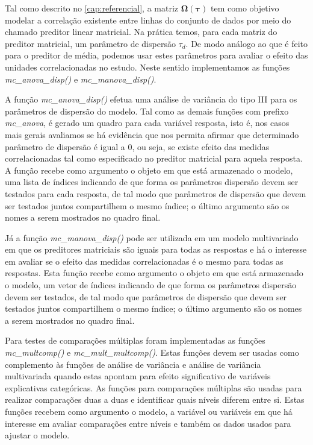 Tal como descrito no \autoref{cap:referencial}, a matriz $\boldsymbol{\Omega({\tau})}$ tem como objetivo modelar a correlação existente entre linhas do conjunto de dados por meio do chamado preditor linear matricial. Na prática temos, para cada matriz do preditor matricial, um parâmetro de dispersão $\tau_d$. De modo análogo ao que é feito para o preditor de média, podemos usar estes parâmetros para avaliar o efeito das unidades correlacionadas no estudo. Neste sentido implementamos as funções \emph{mc\_anova\_disp()} e \emph{mc\_manova\_disp()}. 

A função \emph{mc\_anova\_disp()} efetua uma análise de variância do tipo III para os parâmetros de dispersão do modelo. Tal como as demais funções com prefixo \emph{mc\_anova}, é gerado um quadro para cada variável resposta, isto é, nos casos mais gerais avaliamos se há evidência que nos permita afirmar que determinado parâmetro de dispersão é igual a 0, ou seja, se existe efeito das medidas correlacionadas tal como especificado no preditor matricial para aquela resposta. A função recebe como argumento o objeto em que está armazenado o modelo, uma lista de índices indicando de que forma os parâmetros dispersão devem ser testados para cada resposta, de tal modo que parâmetros de dispersão que devem ser testados juntos compartilhem o mesmo índice; o último argumento são os nomes a serem mostrados no quadro final.

Já a função \emph{mc\_manova\_disp()} pode ser utilizada em um modelo multivariado em que os preditores matriciais são iguais para todas as respostas e há o interesse em avaliar se o efeito das medidas correlacionadas é o mesmo para todas as respostas. Esta função recebe como argumento o objeto em que está armazenado o modelo, um vetor de índices indicando de que forma os parâmetros dispersão devem ser testados, de tal modo que parâmetros de dispersão que devem ser testados juntos compartilhem o mesmo índice; o último argumento são os nomes a serem mostrados no quadro final.

Para testes de comparações múltiplas foram implementadas as funções \emph{mc\_multcomp()} e \emph{mc\_mult\_multcomp()}. Estas funções devem ser usadas como complemento às funções de análise de variância e análise de variância multivariada quando estas apontam para efeito significativo de variáveis explicativas categóricas. As funções para comparações múltiplas são usadas para realizar comparações duas a duas e identificar quais níveis diferem entre si. Estas funções recebem como argumento o modelo, a variável ou variáveis em que há interesse em avaliar comparações entre níveis e também os dados usados para ajustar o modelo.

